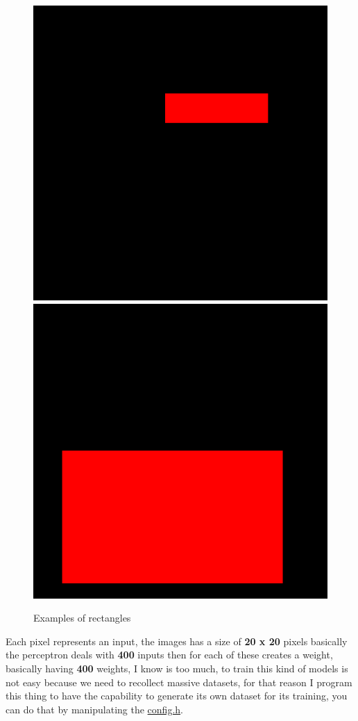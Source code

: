 \documentclass[12pt]{article}
\begin{document}
\begin{figure}[H]
  \centering
  \includegraphics[scale = 0.4]{test_rect-39.png}
  \includegraphics[scale = 0.4]{test_rect-13.png}
  \caption{Examples of rectangles}
\end{figure}
Each pixel represents an input, the images has a size of \textbf{20 x 20} pixels basically the perceptron
deals with \textbf{400} inputs then for each of these creates a weight, basically having
\textbf{400} weights, I know is too much, to train this kind of models is not easy because we
need to recollect massive datasets, for that reason I program this thing to have the capability to
generate its own dataset for its training, you can do that by manipulating the
\href{https://github.com/alecksandr26/machine-learning-code/blob/main/examples/perceptron_rectangle_circle/src/config.h}{config.h}.\\
\end{document}

